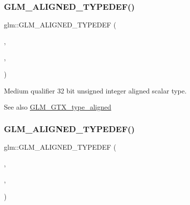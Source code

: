 \subsubsection{\texorpdfstring{G\+L\+M\+\_\+\+A\+L\+I\+G\+N\+E\+D\+\_\+\+T\+Y\+P\+E\+D\+E\+F()}{GLM\_ALIGNED\_TYPEDEF()}\hspace{0.1cm}{\footnotesize\ttfamily [87/209]}}
{\footnotesize\ttfamily glm\+::\+G\+L\+M\+\_\+\+A\+L\+I\+G\+N\+E\+D\+\_\+\+T\+Y\+P\+E\+D\+EF (\begin{DoxyParamCaption}\item[{\mbox{\hyperlink{group__gtc__type__precision_gac7782c1e393f9ad47e41a177a685f287}{mediump\+\_\+uint32\+\_\+t}}}]{,  }\item[{aligned\+\_\+mediump\+\_\+uint32\+\_\+t}]{,  }\item[{4}]{ }\end{DoxyParamCaption})}

Medium qualifier 32 bit unsigned integer aligned scalar type. \begin{DoxySeeAlso}{See also}
\mbox{\hyperlink{group__gtx__type__aligned}{G\+L\+M\+\_\+\+G\+T\+X\+\_\+type\+\_\+aligned}} 
\end{DoxySeeAlso}
\mbox{\label{group__gtx__type__aligned_gad14a0f2ec93519682b73d70b8e401d81}} 
\subsubsection{\texorpdfstring{G\+L\+M\+\_\+\+A\+L\+I\+G\+N\+E\+D\+\_\+\+T\+Y\+P\+E\+D\+E\+F()}{GLM\_ALIGNED\_TYPEDEF()}\hspace{0.1cm}{\footnotesize\ttfamily [88/209]}}
{\footnotesize\ttfamily glm\+::\+G\+L\+M\+\_\+\+A\+L\+I\+G\+N\+E\+D\+\_\+\+T\+Y\+P\+E\+D\+EF (\begin{DoxyParamCaption}\item[{\mbox{\hyperlink{group__gtc__type__precision_gaa97354d3120a6dc029a5e9563723de18}{mediump\+\_\+uint64\+\_\+t}}}]{,  }\item[{aligned\+\_\+mediump\+\_\+uint64\+\_\+t}]{,  }\item[{8}]{ }\end{DoxyParamCaption})}

